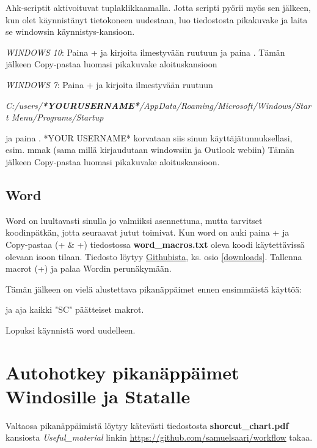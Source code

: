 \documentclass[a5paper,9pt]{scrartcl}
\newcommand*{\mybox}[1]{\framebox{#1}}
\begin{document}
    
    \medskip
  
     Ahk-scriptit aktivoituvat tuplaklikkaamalla. Jotta scripti pyörii myös sen jälkeen, kun olet käynnistänyt tietokoneen uudestaan, luo tiedostosta pikakuvake ja laita se windowsin käynnistys-kansioon.
    
    \medskip
    
    \emph{WINDOWS 10}: Paina + ja kirjoita ilmestyvään ruutuun \mybox{shell::startup} ja paina \keys{\return}. Tämän jälkeen Copy-pastaa luomasi pikakuvake aloituskansioon
    
    \medskip
    
    \emph{WINDOWS 7}: Paina + ja kirjoita ilmestyvään ruutuun 
    
    \emph{C:/users/\textbf{*YOURUSERNAME*}/AppData/Roaming/Microsoft/Windows/Start Menu/Programs/Startup} 
    
    ja paina \keys{\return}. *YOUR USERNAME* korvataan siis sinun käyttäjätunnuksellasi, esim. mmak (sama millä kirjaudutaan windowsiin ja Outlook webiin)
    Tämän jälkeen Copy-pastaa luomasi pikakuvake aloituskansioon.
    
    
    \subsection{Word}
    Word on luultavasti sinulla  jo valmiiksi asennettuna, mutta tarvitset koodinpätkän, jotta seuraavat jutut toimivat. Kun word on auki paina + ja Copy-pastaa (+ \& +) tiedostossa \textbf{word\_macros.txt} oleva koodi käytettävissä olevaan isoon tilaan. Tiedosto löytyy \href{https://github.com/samuelsaari/workflow}{Githubista}, ks. osio \ref{downloads}. Tallenna macrot (+) ja palaa Wordin perunäkymään.
    
    Tämän jälkeen on vielä alustettava pikanäppäimet ennen ensimmäistä käyttöä:
    
    
     ja aja kaikki "SC" päätteiset makrot.
    
    Lopuksi käynnistä word uudelleen. 
    
    
    
    \section{Autohotkey pikanäppäimet Windosille ja Statalle}
    Valtaosa pikanäppäimistä löytyy kätevästi tiedostosta \textbf{shorcut\_chart.pdf} kansiosta \emph{Useful\_material} linkin \url{https://github.com/samuelsaari/workflow} takaa.
    
\end{document}
